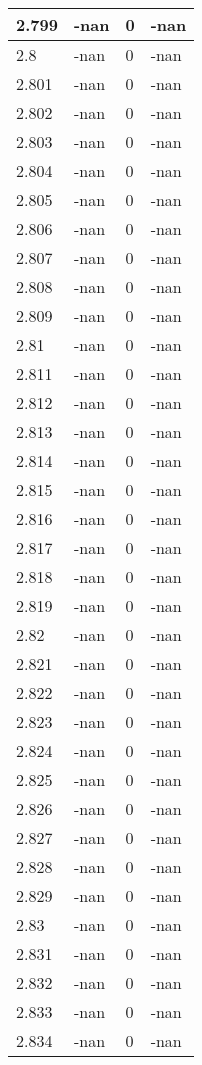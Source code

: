 \documentclass[a4paper,14pt]{extarticle}
\begin{document}
\begin{longtable}{||m{3cm}||m{3cm}|m{3cm}||m{3cm}||}
\hline
2.799 & -nan & 0 & -nan\\
\hline
2.8 & -nan & 0 & -nan\\
\hline
2.801 & -nan & 0 & -nan\\
\hline
2.802 & -nan & 0 & -nan\\
\hline
2.803 & -nan & 0 & -nan\\
\hline
2.804 & -nan & 0 & -nan\\
\hline
2.805 & -nan & 0 & -nan\\
\hline
2.806 & -nan & 0 & -nan\\
\hline
2.807 & -nan & 0 & -nan\\
\hline
2.808 & -nan & 0 & -nan\\
\hline
2.809 & -nan & 0 & -nan\\
\hline
2.81 & -nan & 0 & -nan\\
\hline
2.811 & -nan & 0 & -nan\\
\hline
2.812 & -nan & 0 & -nan\\
\hline
2.813 & -nan & 0 & -nan\\
\hline
2.814 & -nan & 0 & -nan\\
\hline
2.815 & -nan & 0 & -nan\\
\hline
2.816 & -nan & 0 & -nan\\
\hline
2.817 & -nan & 0 & -nan\\
\hline
2.818 & -nan & 0 & -nan\\
\hline
2.819 & -nan & 0 & -nan\\
\hline
2.82 & -nan & 0 & -nan\\
\hline
2.821 & -nan & 0 & -nan\\
\hline
2.822 & -nan & 0 & -nan\\
\hline
2.823 & -nan & 0 & -nan\\
\hline
2.824 & -nan & 0 & -nan\\
\hline
2.825 & -nan & 0 & -nan\\
\hline
2.826 & -nan & 0 & -nan\\
\hline
2.827 & -nan & 0 & -nan\\
\hline
2.828 & -nan & 0 & -nan\\
\hline
2.829 & -nan & 0 & -nan\\
\hline
2.83 & -nan & 0 & -nan\\
\hline
2.831 & -nan & 0 & -nan\\
\hline
2.832 & -nan & 0 & -nan\\
\hline
2.833 & -nan & 0 & -nan\\
\hline
2.834 & -nan & 0 & -nan\\

\end{longtable}
\end{document}

